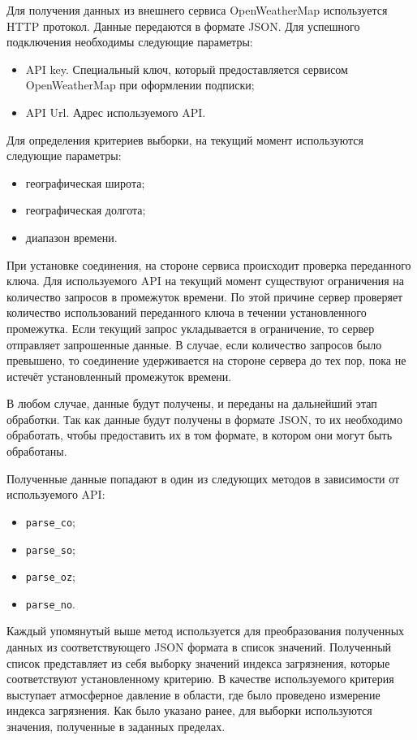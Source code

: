 Для получения данных из внешнего сервиса OpenWeatherMap используется HTTP протокол.
Данные передаются в формате JSON.
Для успешного подключения необходимы следующие параметры:
\begin{itemize}
    \item API key. Специальный ключ, который предоставляется сервисом OpenWeatherMap при оформлении подписки;
    \item API Url. Адрес используемого API.
\end{itemize}

Для определения критериев выборки, на текущий момент используются следующие параметры:
\begin{itemize}
    \item географическая широта;
    \item географическая долгота;
    \item диапазон времени.
\end{itemize}

При установке соединения, на стороне сервиса происходит проверка переданного ключа.
Для используемого API на текущий момент существуют ограничения на количество запросов в промежуток времени.
По этой причине сервер проверяет количество использований переданного ключа в течении установленного промежутка.
Если текущий запрос укладывается в ограничение, то сервер отправляет запрошенные данные.
В случае, если количество запросов было превышено, то соединение удерживается на стороне сервера до тех пор, пока не истечёт установленный промежуток времени.


В любом случае, данные будут получены, и переданы на дальнейший этап обработки.
Так как данные будут получены в формате JSON, то их необходимо обработать, чтобы предоставить их в том формате, в котором они могут быть обработаны.

Полученные данные попадают в один из следующих методов в зависимости от используемого API:
\begin{itemize}
    \item \texttt{parse\_co};
    \item \texttt{parse\_so};
    \item \texttt{parse\_oz};
    \item \texttt{parse\_no}.
\end{itemize}

Каждый упомянутый выше метод используется для преобразования полученных данных из соответствующего JSON формата в список значений.
Полученный список представляет из себя выборку значений индекса загрязнения, которые соответствуют установленному критерию.
В качестве используемого критерия выступает атмосферное давление в области, где было проведено измерение индекса загрязнения.
Как было указано ранее, для выборки используются значения, полученные в заданных пределах.

